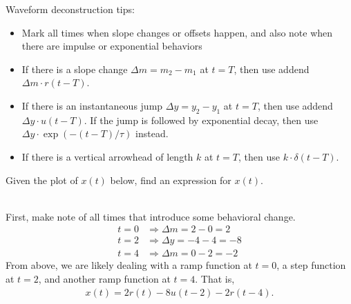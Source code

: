 \documentclass{report}
\begin{document}
\begin{tcolorbox}[width=\textwidth,colback={white}, sharp corners]
    Waveform deconstruction tips:
    \begin{itemize}
        \item Mark all times when slope changes or offsets happen, and also note when there are impulse or exponential behaviors
        \item If there is a slope change $\Delta m=m_2-m_1$ at $t=T$, then use addend $\Delta m \cdot r(t-T)$.
        \item If there is an instantaneous jump $\Delta y=y_2-y_1$ at $t=T$, then use addend $\Delta y\cdot u(t-T)$. If the jump is followed by  
            exponential decay, then use $\Delta y\cdot \exp(-(t-T)/\tau)$ instead.
        \item If there is a vertical arrowhead of length $k$ at $t=T$, then use $k\cdot\delta(t-T)$.
    \end{itemize}
\end{tcolorbox}

\pagebreak
\begin{example}
    Given the plot of $x(t)$ below, find an expression for $x(t)$. \\ \\
\end{example}
\begin{solution}
    First, make note of all times that introduce some behavioral change.
    \begin{align*}
        t=0 &\Longrightarrow \Delta m = 2-0 = 2 \\
        t=2 &\Longrightarrow \Delta y = -4-4 = -8 \\
        t=4 &\Longrightarrow \Delta m = 0-2 = -2
    \end{align*}
    From above, we are likely dealing with a ramp function at $t=0$, a step function at $t=2$, and another ramp function at $t=4$. That is,
    \begin{align*}
        x(t) = 2r(t)-8u(t-2)-2r(t-4).
    \end{align*}
\end{solution}
\end{document}

